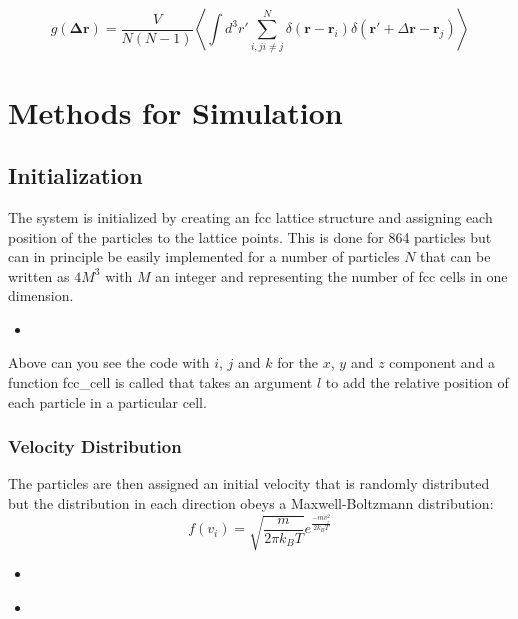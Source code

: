 \documentclass[
10pt, %
a4paper, %
oneside, %
headinclude,footinclude, %
BCOR5mm, %
]{scrartcl}
\newcommand{\insertcode}[2]{\begin{itemize}\item[]\end{itemize}} %
\begin{document}
$$ g(\mathbf{\Delta r}) = \frac{V}{N(N-1)}  \left \langle \int d^3r' \sum_{i,j i \neq j}^N \delta(\mathbf{r}-\mathbf{r}_i) \delta(\mathbf{r'} + \Delta\mathbf{r} - \mathbf{r}_j) \right \rangle $$

\newpage

\section{Methods for Simulation}

\subsection{Initialization}

The system is initialized by creating an fcc lattice structure and assigning each position of the particles to the lattice points. This is done for 864 particles but can in principle be easily implemented for a number of particles $N$ that can be written as $4M^3$ with $M$ an integer and representing the number of fcc cells in one dimension.

\insertcode{"Scripts/initialization_snippet_1.f90"}{Constructing the fcc lattice} %

Above can you see the code with $i$, $j$ and $k$ for the $x$, $y$ and $z$ component and a function fcc\_cell is called that takes an argument $l$ to add the relative position of each particle in a particular cell.


\subsubsection{Velocity Distribution}

The particles are then assigned an initial velocity that is randomly distributed but the distribution in each direction obeys a Maxwell-Boltzmann distribution:
$$ f(v_i) = \sqrt{\frac{m}{2\pi k_B T}} e^{\frac{-mv_i^2}{2k_BT}} $$

\insertcode{"Scripts/initialization_snippet_2.f90"}{Generating initial velocities} %

\insertcode{"Scripts/initialization_snippet_3.f90"}{Removing the center of mass degree of freedom} %
\end{document}
